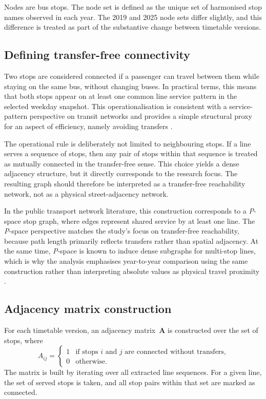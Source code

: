 \documentclass[12pt,a4paper,oneside]{report}
\newcommand{\pspace}{\textit{P}-space}
\begin{document}
Nodes are bus stops.
The node set is defined as the unique set of harmonised stop names observed in each year.
The 2019 and 2025 node sets differ slightly, and this difference is treated as part of the substantive change between timetable versions.

\subsection{Defining transfer-free connectivity}\label{sec:transfer-free-def}

Two stops are considered connected if a passenger can travel between them while staying on the same bus, without changing buses.
In practical terms, this means that both stops appear on at least one common line service pattern in the selected weekday snapshot.
This operationalisation is consistent with a service-pattern perspective on transit networks and provides a simple structural proxy for an aspect of efficiency, namely avoiding transfers \citep{gallotti2014}.

The operational rule is deliberately not limited to neighbouring stops.
If a line serves a sequence of stops, then any pair of stops within that sequence is treated as mutually connected in the transfer-free sense.
This choice yields a dense adjacency structure, but it directly corresponds to the research focus.
The resulting graph should therefore be interpreted as a transfer-free reachability network, not as a physical street-adjacency network.

In the public transport network literature, this construction corresponds to a \pspace{} stop graph, where edges represent shared service by at least one line.
The \pspace{} perspective matches the study's focus on transfer-free reachability, because path length primarily reflects transfers rather than spatial adjacency.
At the same time, \pspace{} is known to induce dense subgraphs for multi-stop lines, which is why the analysis emphasises year-to-year comparison using the same construction rather than interpreting absolute values as physical travel proximity \citep{shanmukhappa2019,zhang2025}.

\subsection{Adjacency matrix construction}\label{sec:adj-matrix-construction}

For each timetable version, an adjacency matrix~$\mathbf{A}$ is constructed over the set of stops, where
\begin{equation}\label{eq:adjacency}
  A_{ij} =
  \begin{cases}
    1 & \text{if stops } i \text{ and } j \text{ are connected without transfers,}\\
    0 & \text{otherwise.}
  \end{cases}
\end{equation}
The matrix is built by iterating over all extracted line sequences.
For a given line, the set of served stops is taken, and all stop pairs within that set are marked as connected.
\end{document}
